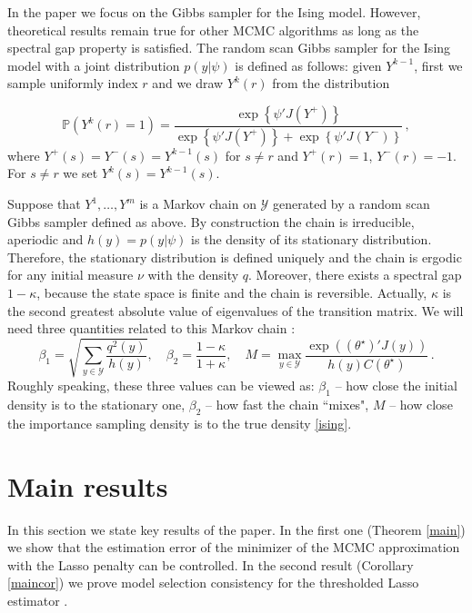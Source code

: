 \documentclass[twoside,11pt]{article}
\def\th{\theta}
\def\ths{\th^\star}
\def\Y{\mathcal{Y}}
\begin{document}
In the paper we focus on the Gibbs sampler for the Ising model. However, theoretical results remain true for other MCMC algorithms as long as the spectral gap property is satisfied.
The random scan Gibbs sampler for the Ising model with a joint distribution  $p(y|\psi)$ is defined as follows: given $Y^{k-1}$, first we sample uniformly index $r$ and we draw $Y^{k}(r)$ from the distribution

\begin{equation}\label{eq:gibbs}
\mathbb{P}(Y^k(r)=1)=\frac{\exp\left\{\psi'J(Y^+)  \right\}}{\exp\left\{\psi'J(Y^+)  \right\}+\exp\left\{\psi'J(Y^-)  \right\}}\,, 
\end{equation}
where $Y^+(s)=Y^-(s)=Y^{k-1}(s)$ for $s\neq r$ and $Y^+(r)=1$, $Y^-(r)=-1$. For $s\neq r$ we set $Y^{k}(s)=Y^{k-1}(s)$.

Suppose that $Y^1,\ldots, Y^m$ is a Markov chain on $\Y$ generated by a random scan Gibbs sampler defined as above. By construction the chain is irreducible, aperiodic and 
 $h(y)=p(y|\psi)$ is the density of its stationary distribution. Therefore, the stationary distribution is defined uniquely and the chain is ergodic for any initial measure $\nu$ with the density $q.$ 
 Moreover, there exists a spectral gap $1-\kappa$, because the state space is finite and the chain is reversible. Actually, $\kappa$ is the second greatest absolute value of eigenvalues of the transition matrix.
We will need three quantities related to this Markov chain :
\begin{equation}
\label{betas}
\beta_1 =\sqrt{ \sum_{y \in \Y} \frac{q^2(y)}{h(y)}}, \quad
\beta_2= \frac{1-\kappa}{1+\kappa}, \quad
M = \max_{y \in \Y} \frac{\exp((\ths)'  J(y))}{  h(y) C(\ths)}\,.
\end{equation}
Roughly speaking, these three values can be viewed as: $\beta_1$ -- how close the initial density is to the stationary one, $\beta_2$ -- how fast the chain ``mixes", $M$ -- how close the importance sampling density is to the true density \eqref{ising}.


\section {Main results}
\label{mainresults}

In this section we state key results of the paper. In the first one (Theorem \ref{main}) we show that the estimation error of the minimizer of the MCMC approximation with the Lasso penalty can be controlled. In the second result (Corollary \ref{maincor}) we prove model selection consistency for the thresholded Lasso estimator \citep{zhou09}.
\end{document}
